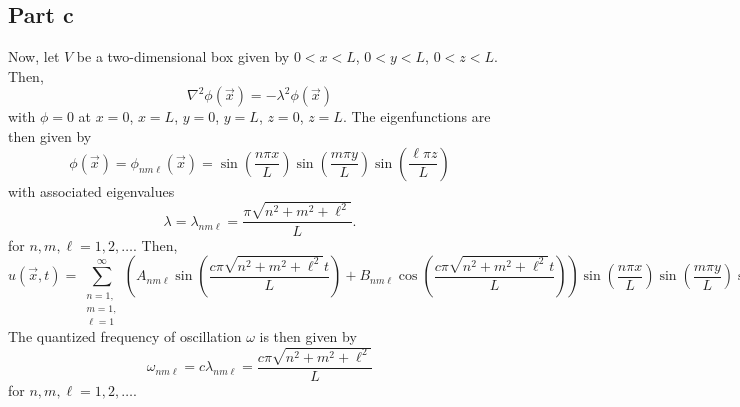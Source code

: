 \documentclass{article}
\begin{document}
\subsection{Part c}
Now, let $V$ be a two-dimensional box given by $0<x<L$, $0<y<L$, $0<z<L$. Then, 
\[
\nabla^2\phi(\vec x)=-\lambda^2\phi(\vec x)
\]
with $\phi=0$ at $x=0$, $x=L$, $y=0$, $y=L$, $z=0$, $z=L$. The eigenfunctions are then given by
\[
\phi(\vec x)=\phi_{nm\ell}(\vec x)=\sin\left(\frac{n\pi x}{L}\right)\sin\left(\frac{m\pi y}{L}\right)\sin\left(\frac{\ell\pi z}{L}\right)
\]
with associated eigenvalues
\[
\lambda=\lambda_{nm\ell}=\frac{\pi\sqrt{n^2+m^2+\ell^2}}{L}.
\]
for $n,m,\ell=1,2,\ldots$.
Then,
\[
u(\vec x,t)=\sum_{\substack{n=1,\\m=1,\\\ell=1}}^\infty\left(A_{nm\ell}\sin\left(\frac{c\pi\sqrt{n^2+m^2+\ell^2}t}{L}\right)+B_{nm\ell}\cos\left(\frac{c\pi\sqrt{n^2+m^2+\ell^2}t}{L}\right)\right)\sin\left(\frac{n\pi x}{L}\right)\sin\left(\frac{m\pi y}{L}\right)\sin\left(\frac{\ell\pi z}{L}\right).
\]
The quantized frequency of oscillation $\omega$ is then given by 
\[
\omega_{nm\ell}=c\lambda_{nm\ell}=\frac{c\pi\sqrt{n^2+m^2+\ell^2}}{L}
\]
for $n,m,\ell=1,2,\ldots$. 
\end{document}
